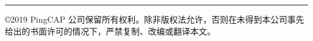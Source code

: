 \noindent \rule{\textwidth}{1pt}

©2019 PingCAP 公司保留所有权利。除非版权法允许，否则在未得到本公司事先给出的书面许可的情况下，严禁复制、改编或翻译本文。 
